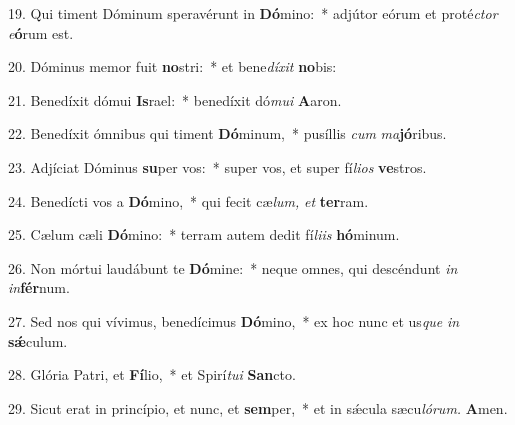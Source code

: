 \item 19. Qui timent Dóminum speravérunt in \textbf{Dó}mino:~* adjútor eórum et proté\textit{ctor} \textit{e}\textbf{ó}rum est.
\item 20. Dóminus memor fuit \textbf{no}stri:~* et bene\textit{díxit} \textbf{no}bis:
\item 21. Benedíxit dómui \textbf{Is}rael:~* benedíxit dó\textit{mui} \textbf{A}aron.
\item 22. Benedíxit ómnibus qui timent \textbf{Dó}minum,~* pusíllis \textit{cum} \textit{ma}\textbf{jó}ribus.
\item 23. Adjíciat Dóminus \textbf{su}per vos:~* super vos, et super fí\textit{lios} \textbf{ve}stros.
\item 24. Benedícti vos a \textbf{Dó}mino,~* qui fecit cæ\textit{lum,} \textit{et} \textbf{ter}ram.
\item 25. Cælum cæli \textbf{Dó}mino:~* terram autem dedit fí\textit{liis} \textbf{hó}minum.
\item 26. Non mórtui laudábunt te \textbf{Dó}mine:~* neque omnes, qui descéndunt \textit{in} \textit{in}\textbf{fér}num.
\item 27. Sed nos qui vívimus, benedícimus \textbf{Dó}mino,~* ex hoc nunc et us\textit{que} \textit{in} \textbf{sǽ}culum.
\item 28. Glória Patri, et \textbf{Fí}lio,~* et Spirí\hspace{0.03em}\textit{tui} \textbf{San}cto.
\item 29. Sicut erat in princípio, et nunc, et \textbf{sem}per,~* et in sǽcula sæcu\hspace{0.03em}\textit{lórum.} \textbf{A}men.
